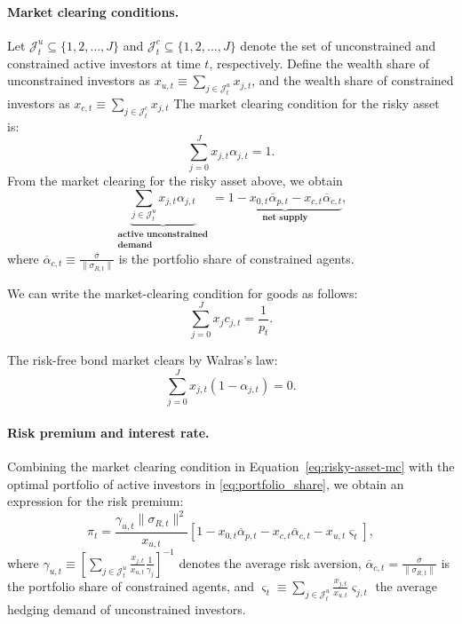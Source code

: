 \paragraph{Market clearing conditions.} 
Let $\mathcal{J}_t^u \subseteq \{1,2,\ldots, J\}$ and $\mathcal{J}_t^c \subseteq \{1,2,\ldots, J\}$ denote the set of unconstrained and constrained active investors at time $t$, respectively.
Define the wealth share of unconstrained investors as $x_{u,t} \equiv \sum_{j\in \mathcal{J}_t^u} x_{j,t}$, and the wealth share of constrained investors as  $x_{c,t} \equiv \sum_{j\in \mathcal{J}_t^c} x_{j,t}$
The market clearing condition for the risky asset is:
\begin{equation}\label{eq:risky-asset-mc2}
	\sum_{j=0}^Jx_{j,t}\alpha_{j,t}=1.
\end{equation}
From the market clearing for the risky asset above, we obtain
\begin{equation}\label{eq:risky-asset-mc}
	\underbrace{\sum_{j \in \mathcal{J}_t^u} x_{j,t} \alpha_{j,t} }_{\substack{\textbf{active unconstrained}\\
			\textbf{demand}}} = \underbrace{1 - x_{0,t} \overline{\alpha}_{p,t} - x_{c,t} \overline{\alpha}_{c,t} }_{\textbf{net supply}},
\end{equation}
where $\overline{\alpha}_{c,t} \equiv\frac{\overline{\sigma}}{\|\sigma_{R,t}\|}$ is the portfolio share of constrained agents. 

We can write the market-clearing condition for goods as follows:
\begin{equation}\label{eq:goods-mc}
	\sum_{j=0}^J x_j c_{j,t} = \frac{1}{p_t}.
\end{equation}

The risk-free bond market clears by Walras's law:
\begin{equation}\label{eq:risk-free-mc}
	\sum_{j=0}^Jx_{j,t}(1-\alpha_{j,t})=0.
\end{equation}


\paragraph{Risk premium and interest rate.} 


Combining the market clearing condition in Equation~\eqref{eq:risky-asset-mc} with the optimal portfolio of active investors in \eqref{eq:portfolio_share}, we obtain an expression for the risk premium:
\begin{equation}\label{eq:sharpe_ratio}
	\pi_{t} =  \frac{\gamma_{u,t} \|\sigma_{R,t}\|^2}{x_{u,t}} \left[ 1 - x_{0,t} \overline{\alpha}_{p,t} - x_{c,t} \overline{\alpha}_{c,t} - x_{u,t} \varsigma_{t} \right] ,
\end{equation}
where $\gamma_{u,t} \equiv \left[ \sum_{j\in\mathcal{J}_t^u} \frac{x_{j,t}}{x_{u,t}} \frac{1}{\gamma_j}\right]^{-1}$ denotes the average risk aversion, $ \overline{\alpha}_{c,t}=\frac{\overline{\sigma}}{\|\sigma_{R,t}\|} $ is the portfolio share of constrained agents, and $\varsigma_t \equiv \sum_{j\in \mathcal{J}_t^u} \frac{x_{j,t}}{x_{u,t}} \varsigma_{j,t} $ the average hedging demand of unconstrained investors.

